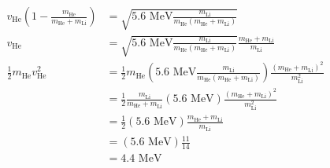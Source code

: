 \documentclass{esg8012pset}
\begin{document}
\begin{solution}
\begin{enumerate}[a)]
\begin{align*}
    v_{\text{He}}\left(1  - \frac{m_{\text{He}}}{m_{\text{He}} + m_{\text{Li}}}\right) & = \sqrt{5.6\text{ MeV}\frac{m_{\text{Li}}}{m_{\text{He}}(m_{\text{He}} + m_{\text{Li}})}} \\
    v_{\text{He}} & = \sqrt{5.6\text{ MeV}\frac{m_{\text{Li}}}{m_{\text{He}}(m_{\text{He}} + m_{\text{Li}})}}\frac{m_{\text{He}} + m_{\text{Li}}}{m_{\text{Li}}} \\
    \frac{1}{2}m_{\text{He}}v_{\text{He}}^2 & = \frac{1}{2}m_{\text{He}}\left(5.6\text{ MeV}\frac{m_{\text{Li}}}{m_{\text{He}}(m_{\text{He}} + m_{\text{Li}})}\right)\frac{(m_{\text{He}} + m_{\text{Li}})^2}{m_{\text{Li}}^2} \\
    & = \frac{1}{2}\frac{m_{\text{Li}}}{m_{\text{He}} + m_{\text{Li}}}\left(5.6\text{ MeV}\right)\frac{(m_{\text{He}} + m_{\text{Li}})^2}{m_{\text{Li}}^2} \\
    & = \frac{1}{2}(5.6\text{ MeV})\frac{m_{\text{He}} + m_{\text{Li}}}{m_{\text{Li}}} \\
    & = (5.6\text{ MeV})\frac{11}{14} \\
    & = 4.4\text{ MeV}
  \end{align*} %


\end{enumerate}
\end{solution}
\end{document}
